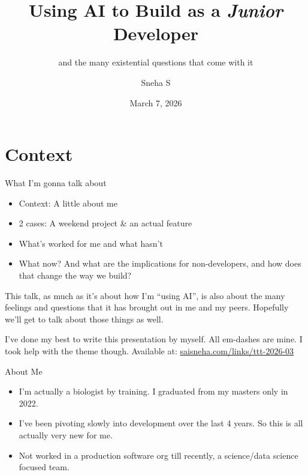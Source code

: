 \documentclass{beamer}
\title[Using AI as a \textit{Junior} Dev]{Using AI to Build as a \textit{Junior} Developer}
\subtitle{and the many existential questions that come with it}
\author[Sneha S]{Sneha S}
\date{March 7, 2026}
\begin{document}
\maketitle

\section{Context}

\begin{frame}{What I'm gonna talk about}
    \begin{itemize}
        \item Context: A little about me
        \item 2 cases: A weekend project \& an actual feature
        \item What's worked for me and what hasn't
        \item What now? And what are the implications for non-developers, and how does that change the way we build?
    \end{itemize}

    \pause
    \vspace{1em}
    \footnotesize
    This talk, as much as it's about how I'm ``using AI'', is also about the many feelings and questions that it has brought out in me and my peers. Hopefully we'll get to talk about those things as well.

    \vspace{2em}
    \scriptsize
    I've done my best to write this presentation by myself. All em-dashes are mine. I took help with the theme though. Available at: \url{saisneha.com/links/ttt-2026-03}


\end{frame}


\begin{frame}{About Me}

    \begin{itemize}[<+->]
    \item I'm actually a biologist by training. I graduated from my masters only in 2022.
    \item I've been pivoting slowly into development over the last 4 years. So this is all actually very new for me.
    \item Not worked in a production software org till recently, a science/data science focused team.
    \end{itemize}

\end{frame}
\end{document}

